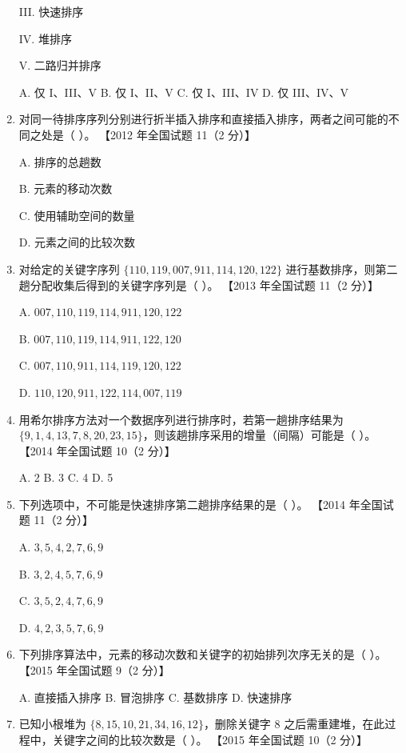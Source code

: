 \documentclass[lang=cn,newtx,10pt,scheme=chinese]{elegantbook}
\begin{document}
\begin{enumerate}
    III. 快速排序  

    IV. 堆排序  

    V. 二路归并排序  

    A. 仅 I、III、V \quad B. 仅 I、II、V \quad C. 仅 I、III、IV \quad D. 仅 III、IV、V  

    \item 对同一待排序序列分别进行折半插入排序和直接插入排序，两者之间可能的不同之处是（ ）。  
    【2012 年全国试题 11（2 分）】  

    A. 排序的总趟数  

    B. 元素的移动次数  

    C. 使用辅助空间的数量  

    D. 元素之间的比较次数

    \item 对给定的关键字序列 $\{110, 119, 007, 911, 114, 120, 122\}$ 进行基数排序，则第二趟分配收集后得到的关键字序列是（ ）。  
    【2013 年全国试题 11（2 分）】  

    A. $007, 110, 119, 114, 911, 120, 122$  

    B. $007, 110, 119, 114, 911, 122, 120$  

    C. $007, 110, 911, 114, 119, 120, 122$  

    D. $110, 120, 911, 122, 114, 007, 119$  

    \item 用希尔排序方法对一个数据序列进行排序时，若第一趟排序结果为 $\{9, 1, 4, 13, 7, 8, 20, 23, 15\}$，则该趟排序采用的增量（间隔）可能是（ ）。  
    【2014 年全国试题 10（2 分）】  

    A. 2 \quad B. 3 \quad C. 4 \quad D. 5  

    \item 下列选项中，不可能是快速排序第二趟排序结果的是（ ）。  
    【2014 年全国试题 11（2 分）】  

    A. $3, 5, 4, 2, 7, 6, 9$  

    B. $3, 2, 4, 5, 7, 6, 9$  

    C. $3, 5, 2, 4, 7, 6, 9$  

    D. $4, 2, 3, 5, 7, 6, 9$  

    \item 下列排序算法中，元素的移动次数和关键字的初始排列次序无关的是（ ）。  
    【2015 年全国试题 9（2 分）】  

    A. 直接插入排序 \quad B. 冒泡排序 \quad C. 基数排序 \quad D. 快速排序  

    \item 已知小根堆为 $\{8, 15, 10, 21, 34, 16, 12\}$，删除关键字 8 之后需重建堆，在此过程中，关键字之间的比较次数是（ ）。  
    【2015 年全国试题 10（2 分）】  


\end{enumerate}
\end{document}

